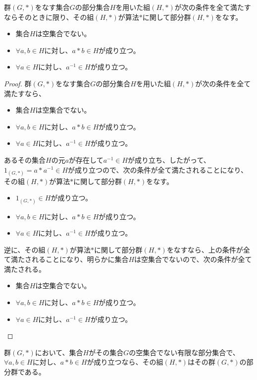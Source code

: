 \documentclass[dvipdfmx]{jsarticle}
\begin{document}
\begin{thm}\label{3.1.1.7}
群$(G,*)$をなす集合$G$の部分集合$H$を用いた組$(H,*)$が次の条件を全て満たすならそのときに限り、その組$(H,*)$が算法$*$に関して部分群$(H,*)$をなす。
\begin{itemize}
\item
  集合$H$は空集合でない。
\item
  $\forall a,b \in H$に対し、$a*b \in H$が成り立つ。
\item
  $\forall a \in H$に対し、$a^{- 1} \in H$が成り立つ。
\end{itemize}
\end{thm}
\begin{proof}
群$(G,*)$をなす集合$G$の部分集合$H$を用いた組$(H,*)$が次の条件を全て満たすなら、
\begin{itemize}
\item
  集合$H$は空集合でない。
\item
  $\forall a,b \in H$に対し、$a*b \in H$が成り立つ。
\item
  $\forall a \in H$に対し、$a^{- 1} \in H$が成り立つ。
\end{itemize}
あるその集合$H$の元$a$が存在して$a^{- 1} \in H$が成り立ち、したがって、$1_{(G,*)} = a*a^{- 1} \in H$が成り立つので、次の条件が全て満たされることになり、その組$(H,*)$が算法$*$に関して部分群$(H,*)$をなす。
\begin{itemize}
\item
  $1_{(G,*)} \in H$が成り立つ。
\item
  $\forall a,b \in H$に対し、$a*b \in H$が成り立つ。
\item
  $\forall a \in H$に対し、$a^{- 1} \in H$が成り立つ。
\end{itemize}
逆に、その組$(H,*)$が算法$*$に関して部分群$(H,*)$をなすなら、上の条件が全て満たされることになり、明らかに集合$H$は空集合でないので、次の条件が全て満たされる。
\begin{itemize}
\item
  集合$H$は空集合でない。
\item
  $\forall a,b \in H$に対し、$a*b \in H$が成り立つ。
\item
  $\forall a \in H$に対し、$a^{- 1} \in H$が成り立つ。
\end{itemize}
\end{proof}
\begin{thm}\label{3.1.1.8}
群$(G,*)$において、集合$H$がその集合$G$の空集合でない有限な部分集合で、$\forall a,b \in H$に対し、$a*b \in H$が成り立つなら、その組$(H,*)$はその群$(G,*)$の部分群である。
\end{thm}
\end{document}
